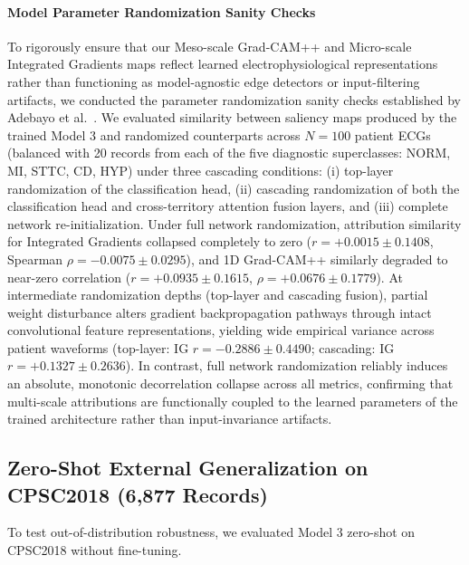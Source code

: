 \documentclass[12pt]{elsarticle}
\begin{document}
\paragraph{Model Parameter Randomization Sanity Checks}
To rigorously ensure that our Meso-scale Grad-CAM++ and Micro-scale Integrated Gradients maps reflect learned electrophysiological representations rather than functioning as model-agnostic edge detectors or input-filtering artifacts, we conducted the parameter randomization sanity checks established by Adebayo et al.~\cite{adebayo2018sanity}. We evaluated similarity between saliency maps produced by the trained Model 3 and randomized counterparts across $N = 100$ patient ECGs (balanced with 20 records from each of the five diagnostic superclasses: NORM, MI, STTC, CD, HYP) under three cascading conditions: (i) top-layer randomization of the classification head, (ii) cascading randomization of both the classification head and cross-territory attention fusion layers, and (iii) complete network re-initialization. Under full network randomization, attribution similarity for Integrated Gradients collapsed completely to zero ($r = +0.0015 \pm 0.1408$, Spearman $\rho = -0.0075 \pm 0.0295$), and 1D Grad-CAM++ similarly degraded to near-zero correlation ($r = +0.0935 \pm 0.1615$, $\rho = +0.0676 \pm 0.1779$). At intermediate randomization depths (top-layer and cascading fusion), partial weight disturbance alters gradient backpropagation pathways through intact convolutional feature representations, yielding wide empirical variance across patient waveforms (top-layer: IG $r = -0.2886 \pm 0.4490$; cascading: IG $r = +0.1327 \pm 0.2636$). In contrast, full network randomization reliably induces an absolute, monotonic decorrelation collapse across all metrics, confirming that multi-scale attributions are functionally coupled to the learned parameters of the trained architecture rather than input-invariance artifacts.

\subsection{Zero-Shot External Generalization on CPSC2018 (6,877 Records)}
To test out-of-distribution robustness, we evaluated Model 3 zero-shot on CPSC2018 without fine-tuning.
\end{document}
